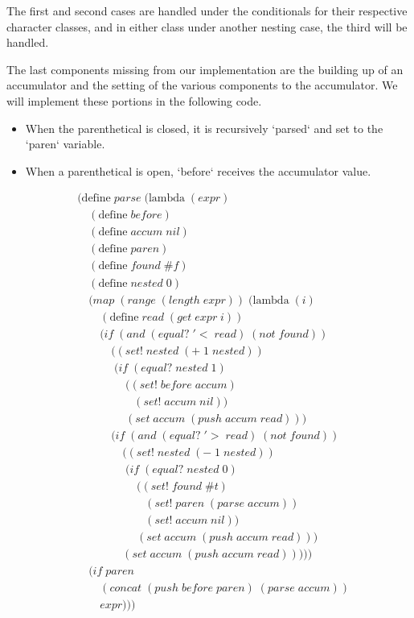 The first and second cases are handled under the conditionals for their respective 
character classes, and in either class under another nesting case, the third will be 
handled.

The last components missing from our implementation are the building up of an 
accumulator and the setting of the various components to the accumulator. We will 
implement these portions in the following code.

\begin{itemize}
  \item When the parenthetical is closed, it is recursively `parsed` and set to the `paren` variable.
  \item When a parenthetical is open, `before` receives the accumulator value.
\end{itemize}

\clearpage
\begin{align*}
& (\text{define} \; parse \; (\text{lambda} \; (expr) \; 
\\& \quad (\text{define} \; before)
\\& \quad (\text{define} \; accum \; nil)
\\& \quad (\text{define} \; paren)
\\& \quad (\text{define} \; found \; \#f)
\\& \quad (\text{define} \; nested \; 0)
\\& \quad (map \; (range \; (length \; expr)) \; (\text{lambda} \; (i)
\\& \qquad (\text{define} \; read \; (get \; expr \; i))
\\& \qquad (if \; (and \; (equal? \; '< \; read) \; (not \; found))
\\& \qquad \quad ((set! \; nested \; (+ \; 1 \; nested))
\\& \qquad \quad \; (if \; (equal? \; nested \; 1)
\\& \qquad \qquad \; ((set! \; before \; accum)
\\& \qquad \qquad \quad (set! \; accum \; nil))
\\& \qquad \qquad \; (set \; accum \; (push \; accum \; read)))
\\& \qquad \quad (if \; (and \; (equal? \; '> \; read) \; (not \; found))
\\& \qquad \qquad ((set! \; nested \; (- \; 1 \; nested))
\\& \qquad \qquad \; (if \; (equal? \; nested \; 0)
\\& \qquad \qquad \quad \; ((set! \; found \; \#t)
\\& \qquad \qquad \qquad (set! \; paren \; (parse \; accum))
\\& \qquad \qquad \qquad (set! \; accum \; nil))
\\& \qquad \qquad \quad \; (set \; accum \; (push \; accum \; read)))
\\& \qquad \qquad (set \; accum \; (push \; accum \; read)))))
\\& \quad (if \; paren
\\& \qquad (concat \; (push \; before \; paren) \; (parse \; accum))
\\& \qquad expr)))
\end{align*}

